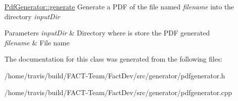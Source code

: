 \hyperlink{classGenerator_1_1PdfGenerator_a2fcb924e15c201474e0071f81541b0ae}{Pdf\-Generator\-::generate} Generate a P\-D\-F of the file named {\itshape filename} into the directory {\itshape input\-Dir} 


\begin{DoxyParams}{Parameters}
{\em input\-Dir} & Directory where is store the P\-D\-F generated \\
\hline
{\em filename} & File name \\
\hline
\end{DoxyParams}


The documentation for this class was generated from the following files\-:\begin{DoxyCompactItemize}
\item 
/home/travis/build/\-F\-A\-C\-T-\/\-Team/\-Fact\-Dev/src/generator/pdfgenerator.\-h\item 
/home/travis/build/\-F\-A\-C\-T-\/\-Team/\-Fact\-Dev/src/generator/pdfgenerator.\-cpp\end{DoxyCompactItemize}
